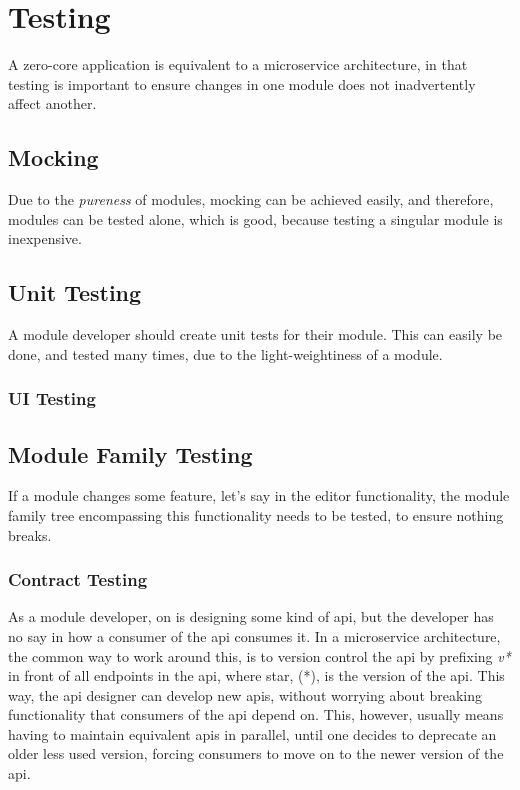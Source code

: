 \section{Testing} \label{sec:testing}


A zero-core application is equivalent to a microservice architecture, in that
testing is important to ensure changes in one module does not inadvertently
affect another.

\subsection{Mocking}

Due to the \textit{pureness} of modules, mocking can be achieved easily, and
therefore, modules can be tested alone, which is good, because testing a
singular module is inexpensive.

\subsection{Unit Testing}

A module developer should create unit tests for their module. This can easily be
done, and tested many times, due to the light-weightiness of a module.

\subsubsection{UI Testing}


\subsection{Module Family Testing}

If a module changes some feature, let's say in the editor functionality, the
module family tree encompassing this functionality needs to be tested, to ensure
nothing breaks.

\subsubsection{Contract Testing}


As a module developer, on is designing some kind of \gls{api}, but the developer
has no say in how a consumer of the \gls{api} consumes it. In a microservice
architecture, the common way to work around this, is to version control the
\gls{api} by prefixing \textit{v*} in front of all endpoints in the \gls{api},
where star, (*), is the version of the \gls{api}. This way, the \gls{api}
designer can develop new \gls{api}s, without worrying about breaking
functionality that consumers of the \gls{api} depend on. This, however, usually
means having to maintain equivalent \gls{api}s in parallel, until one decides
to deprecate an older less used version, forcing consumers to move on to the
newer version of the \gls{api}.

